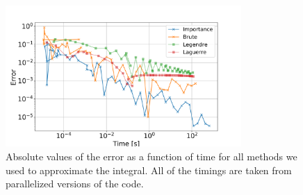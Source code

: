 \begin{figure}[H]
  \centering
  \includegraphics[width=0.8\textwidth]{../figures/time_compare.png}
  \caption{Absolute values of the error as a function of time for all methods we
  used to approximate the integral. All of the timings are taken from parallelized
  versions of the code.}

  \label{fig:time_compare}
\end{figure}

